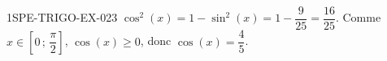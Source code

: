 \begin{corrige}{1SPE-TRIGO-EX-023}
$\cos^2(x) = 1 - \sin^2(x) = 1 - \dfrac{9}{25} = \dfrac{16}{25}$. Comme $x \in \left[0 \,;\, \dfrac{\pi}{2}\right]$, $\cos(x) \geq 0$, donc $\cos(x) = \dfrac{4}{5}$.
\end{corrige}

%
%
%
